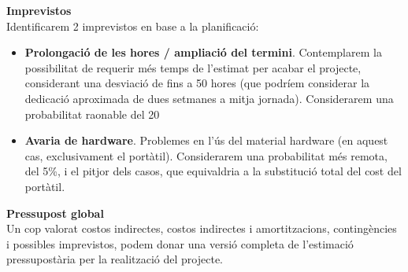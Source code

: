 \noindent \textbf{\large Imprevistos}\\

\noindent Identificarem 2 imprevistos en base a la planificació:

\begin{itemize}
\item \textbf{Prolongació de les hores / ampliació del termini}. Contemplarem la possibilitat de requerir més temps de l’estimat per acabar el projecte, considerant una desviació de fins a 50 hores (que podríem considerar la dedicació aproximada de dues setmanes a mitja jornada). Considerarem una probabilitat raonable del 20%
\item \textbf{Avaria de hardware}. Problemes en l’ús del material hardware (en aquest cas, exclusivament el portàtil). Considerarem una probabilitat més remota, del 5\%, i el pitjor dels casos, que equivaldria a la substitució total del cost del portàtil.
\end{itemize}

\begin{table}[htb]
\centering
\label{PressupostImprevistos}
\caption{Imprevistos}
\end{table}

\noindent \textbf{\large Pressupost global}\\

\noindent Un cop valorat costos indirectes, costos indirectes i amortitzacions, contingències i possibles imprevistos, podem donar una versió completa de l’estimació pressupostària per la realització del projecte.

